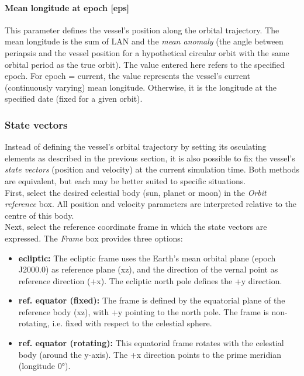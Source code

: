 \documentclass[Orbiter User Manual.tex]{subfiles}
\begin{document}
\paragraph{Mean longitude at epoch [eps]}
This parameter defines the vessel's position along the orbital trajectory. The mean longitude is the sum of LAN and the \textit{mean anomaly} (the angle between periapsis and the vessel position for a hypothetical circular orbit with the same orbital period as the true orbit). The value entered here refers to the specified epoch. For epoch = current, the value represents the vessel's current (continuously varying) mean longitude. Otherwise, it is the longitude at the specified date (fixed for a given orbit).

\subsubsection{State vectors}
Instead of defining the vessel's orbital trajectory by setting its osculating elements as described in the previous section, it is also possible to fix the vessel's \textit{state vectors} (position and velocity) at the current simulation time. Both methods are equivalent, but each may be better suited to specific situations.\\
First, select the desired celestial body (sun, planet or moon) in the \textit{Orbit reference} box. All position and velocity parameters are interpreted relative to the centre of this body.\\
Next, select the reference coordinate frame in which the state vectors are expressed. The \textit{Frame} box provides three options:

\begin{itemize}
\item \textbf{ecliptic:} The ecliptic frame uses the Earth's mean orbital plane (epoch J2000.0) as reference plane (xz), and the direction of the vernal point as reference direction (+x). The ecliptic north pole defines the +y direction.
\item \textbf{ref. equator (fixed):} The frame is defined by the equatorial plane of the reference body (xz), with +y pointing to the north pole. The frame is non-rotating, i.e. fixed with respect to the celestial sphere.
\item \textbf{ref. equator (rotating):} This equatorial frame rotates with the celestial body (around the y-axis). The +x direction points to the prime meridian (longitude 0°).
\end{itemize}
\end{document}
